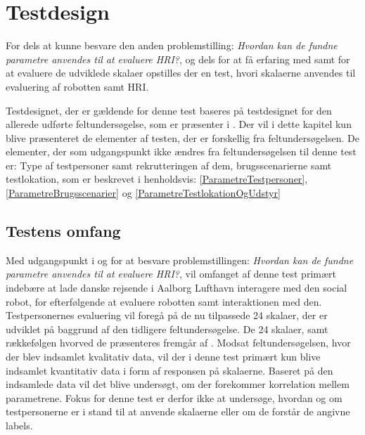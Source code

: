 \chapter{Testdesign}
\label{TestAfSkalaTestdesign}
%
For dels at kunne besvare den anden problemstilling: \textit{Hvordan kan de fundne parametre anvendes til at evaluere HRI?}, og dels for at få erfaring med samt for at evaluere de udviklede skalaer opstilles der en test, hvori skalaerne anvendes til evaluering af robotten samt HRI. 

Testdesignet, der er gældende for denne test baseres på testdesignet for den allerede udførte feltundersøgelse, som er præsenter i . Der vil i dette kapitel kun blive præsenteret de elementer af testen, der er forskellig fra feltundersøgelsen. De elementer, der som udgangspunkt ikke ændres fra feltundersøgelsen til denne test er: Type af testpersoner samt rekrutteringen af dem, brugsscenarierne samt testlokation, som er beskrevet i henholdsvis: \autoref{ParametreTestpersoner}, \autoref{ParametreBrugsscenarier} og \autoref{ParametreTestlokationOgUdstyr} 
%
\section{Testens omfang}
\label{TestAfSkalaTestensOmfang}
%
Med udgangspunkt i og for at besvare problemstillingen: \textit{Hvordan kan de fundne parametre anvendes til at evaluere HRI?}, vil omfanget af denne test primært indebære at lade danske rejsende i Aalborg Lufthavn interagere med den social robot, for efterfølgende at evaluere robotten samt interaktionen med den. Testpersonernes evaluering vil foregå på de nu tilpassede 24 skalaer, der er udviklet på baggrund af den tidligere feltundersøgelse. De 24 skalaer, samt rækkefølgen hvorved de præsenteres fremgår af . Modsat feltundersøgelsen, hvor der blev indsamlet kvalitativ data, vil der i denne test primært kun blive indsamlet kvantitativ data i form af responsen på skalaerne. Baseret på den indsamlede data vil det blive undersøgt, om der forekommer korrelation mellem parametrene. Fokus for denne test er derfor ikke at undersøge, hvordan og om testpersonerne er i stand til at anvende skalaerne eller om de forstår de angivne labels.
\newpage